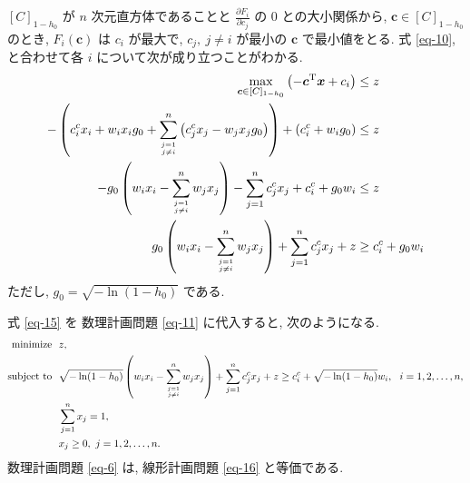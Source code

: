 \documentclass[uplatex, a4j, 11pt, fleqn, dvipdfmx]{article}
\newcommand{\substk}[2]{%
	#1 \atop \vphantom{#1} #2
}
\begin{document}
$[C]_{1 - h_0}$ が $n$ 次元直方体であることと $\frac{\partial F_i}{\partial c_j}$ の 0 との大小関係から, $\bm{c} \in [C]_{1 - h_0}$ のとき, $F_i(\bm{c})$ は $c_i$ が最大で, $c_j,~ j \neq i$ が最小の $\bm{c}$ で最小値をとる.
式 \eqref{eq-10}, と合わせて各 $i$ について次が成り立つことがわかる.
\begin{align}
	\max_{\bm{c} \in [C]_{1 - h_0}} \left( - \bm{c}^\mathrm{T} \bm{x} + c_i \right)                                                                      & \leq z \nonumber     \\
	- \left( c_i^c x_i + w_i x_i g_0 + \sum_{\substk{j = 1}{j \neq i}}^n \left( c_j^c x_j - w_j x_j g_0 \right) \right) + \left( c_i^c + w_i g_0 \right) & \leq z \nonumber     \\
	- g_0 \left( w_i x_i - \sum_{\substk{j = 1}{j \neq i}}^n w_j x_j  \right) - \sum_{j = 1}^n c_j^c x_j + c_i^c + g_0 w_i                               & \leq z \nonumber     \\
	g_0 \left( w_i x_i - \sum_{\substk{j = 1}{j \neq i}}^n w_j x_j  \right) + \sum_{j = 1}^n c_j^c x_j + z                                               & \geq c_i^c + g_0 w_i
	\label{eq-15}
\end{align}
ただし, $g_0 = \sqrt{- \ln ( 1 - h_0 )}$ である.

式 \eqref{eq-15} を 数理計画問題 \eqref{eq-11} に代入すると, 次のようになる.
\begin{align}
	\begin{aligned}
		\text{minimize} ~   & ~ z,                                                                                                                                                                                            \\
		\text{subject to} ~ & ~ \sqrt{- \ln ( 1 - h_0 )} \left( w_i x_i - \sum_{\substk{j = 1}{j \neq i}}^n w_j x_j  \right) + \sum_{j = 1}^n c_j^c x_j + z \geq c_i^c + \sqrt{- \ln ( 1 - h_0 )} w_i, ~~ i = 1, 2, \dots, n, \\
		                    & ~ \sum_{j = 1}^{n} x_j = 1,                                                                                                                                                                     \\
		                    & ~ x_j \geq 0, ~ j = 1, 2, \dots, n.
	\end{aligned}
	\label{eq-16}
\end{align}
数理計画問題 \eqref{eq-6} は, 線形計画問題 \eqref{eq-16} と等価である.
\end{document}
